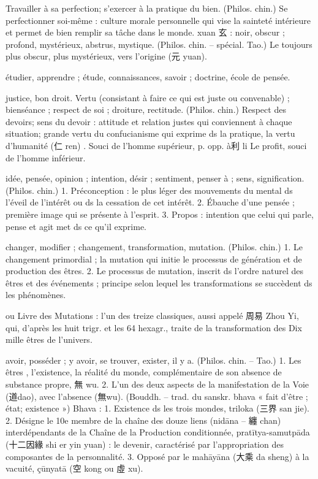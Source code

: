 \begin{Def}[xiushen 修身]
    Travailler à sa perfection; s’exercer à la pratique du bien. (Philos. chin.) Se perfectionner soi-même : culture morale personnelle qui vise la sainteté intérieure et permet de bien remplir sa tâche dans le monde. xuan 玄 : noir, obscur ; profond, mystérieux, abstrus, mystique. (Philos. chin. – spécial. Tao.) Le toujours plus obscur, plus mystérieux, vers l’origine (元 yuan). 
\end{Def}
\begin{Def}[xue 學]
    étudier, apprendre ; étude, connaissances, savoir ; doctrine, école de pensée.
\end{Def}
\begin{Def}[yi 義]
    justice, bon droit. Vertu (consistant à faire ce qui est juste ou convenable) ; bienséance ; respect de soi ; droiture, rectitude. (Philos. chin.) Respect des devoirs; sens du devoir : attitude et relation justes qui conviennent à chaque situation; grande vertu du confucianisme qui exprime ds la pratique, la vertu d’humanité (仁 ren) . Souci de l’homme supérieur, p. opp. à利 li Le profit, souci de l’homme inférieur. 
\end{Def}
\begin{Def}[yi 意]
    idée, pensée, opinion ; intention, désir ; sentiment, penser à ; sens, signification. (Philos. chin.) 1. Préconception : le plus léger des mouvements du mental ds l’éveil de l’intérêt ou ds la cessation de cet intérêt. 2. Ébauche d’une pensée ; première image qui se présente à l’esprit. 3. Propos : intention que celui qui parle, pense et agit met ds ce qu’il exprime. 
\end{Def}
\begin{Def}[yi 易]
    changer, modifier ; changement, transformation, mutation. (Philos. chin.) 1. Le changement primordial ; la mutation qui initie le processus de génération et de production des êtres. 2. Le processus de mutation, inscrit ds l’ordre naturel des êtres et des événements ; principe selon lequel les transformations se succèdent ds les phénomènes.
\end{Def}
\begin{Def}[易經 Yi Jing]
    ou Livre des Mutations : l’un des treize classiques, aussi appelé 周易 Zhou Yi, qui, d’après les huit trigr. et les 64 hexagr., traite de la transformation des Dix mille êtres de l’univers. 
\end{Def}
\begin{Def}[you 有]
    avoir, posséder ; y avoir, se trouver, exister, il y a. (Philos. chin. – Tao.) 1. Les êtres , l’existence, la réalité du monde, complémentaire de son absence de substance propre, 無 wu. 2. L’un des deux aspects de la manifestation de la Voie (道dao), avec l’absence (無wu). (Bouddh. – trad. du sanskr. bhava « fait d’être ; état; existence ») Bhava : 1. Existence ds les trois mondes, triloka (三界 san jie). 2. Désigne le 10e membre de la chaîne des douze liens (nidāna – 纏 chan) interdépendants de la Chaîne de la Production conditionnée, pratītya-samutpāda (十二因緣 shi er yin yuan) : le devenir, caractérisé par l’appropriation des composantes de la personnalité. 3. Opposé par le mahāyāna (大乘 da sheng) à la vacuité, çūnyatā (空 kong ou 虛 xu). 
\end{Def}
